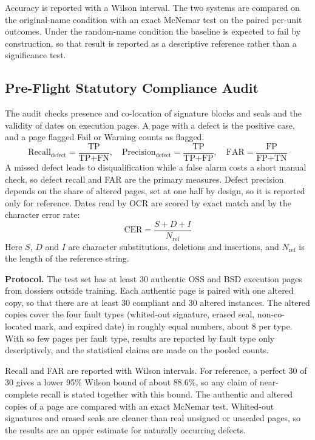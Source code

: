 Accuracy is reported with a Wilson interval. The two systems are compared on the original-name condition with an exact McNemar test on the paired per-unit outcomes. Under the random-name condition the baseline is expected to fail by construction, so that result is reported as a descriptive reference rather than a significance test.

\subsection{Pre-Flight Statutory Compliance Audit}
\label{sec:eval_statutory_audit}

The audit checks presence and co-location of signature blocks and seals and the validity of dates on execution pages. A page with a defect is the positive case, and a page flagged Fail or Warning counts as flagged.
\begin{equation}
\label{eq:defect_recall_far}
\text{Recall}_{\text{defect}} = \frac{\text{TP}}{\text{TP} + \text{FN}}, \quad \text{Precision}_{\text{defect}} = \frac{\text{TP}}{\text{TP} + \text{FP}}, \quad \text{FAR} = \frac{\text{FP}}{\text{FP} + \text{TN}}
\end{equation}
A missed defect leads to disqualification while a false alarm costs a short manual check, so defect recall and FAR are the primary measures. Defect precision depends on the share of altered pages, set at one half by design, so it is reported only for reference. Dates read by OCR are scored by exact match and by the character error rate:
\begin{equation}
\label{eq:cer_metric}
\text{CER} = \frac{S+D+I}{N_{\text{ref}}}
\end{equation}
Here $S$, $D$ and $I$ are character substitutions, deletions and insertions, and $N_{\mathrm{ref}}$ is the length of the reference string.

\textbf{Protocol.} The test set has at least 30 authentic OSS and BSD execution pages from dossiers outside training. Each authentic page is paired with one altered copy, so that there are at least 30 compliant and 30 altered instances. The altered copies cover the four fault types (whited-out signature, erased seal, non-co-located mark, and expired date) in roughly equal numbers, about 8 per type. With so few pages per fault type, results are reported by fault type only descriptively, and the statistical claims are made on the pooled counts.

Recall and FAR are reported with Wilson intervals. For reference, a perfect 30 of 30 gives a lower 95\% Wilson bound of about 88.6\%, so any claim of near-complete recall is stated together with this bound. The authentic and altered copies of a page are compared with an exact McNemar test. Whited-out signatures and erased seals are cleaner than real unsigned or unsealed pages, so the results are an upper estimate for naturally occurring defects.

